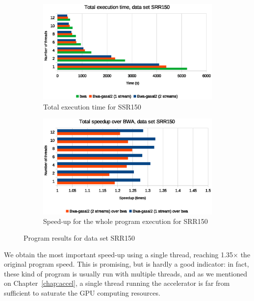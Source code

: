 \begin{figure}[p]
	\centering
	\begin{subfigure}[t]{1\textwidth}
		\centering
			\includegraphics[width=1\textwidth]{srr150/total-exec-time-srr150}
		\caption{Total execution time for SSR150}
		\label{fig:total-exec-time-srr150}
	\end{subfigure}%
	
	\begin{subfigure}[b]{1\textwidth}
		\centering
		\includegraphics[width=1\textwidth]{srr150/total-exec-speed-up-srr150}
		\caption{Speed-up for the whole program execution for SRR150}
		\label{fig:total-exec-speed-up-srr150}
	\end{subfigure}
	\caption{Program results for data set SRR150}
\end{figure}


We obtain the most important speed-up using a single thread, reaching 1.35$\times$ the original program speed. This is promising, but is hardly a good indicator: in fact, these kind of program is usually run with multiple threads, and as we mentioned on Chapter~\ref{chap:accel}, a single thread running the accelerator is far from sufficient to saturate the GPU computing resources.

